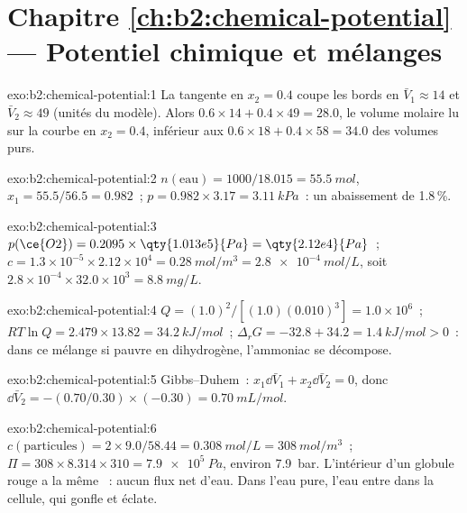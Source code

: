 \section*{Chapitre \ref{ch:b2:chemical-potential} --- Potentiel chimique et mélanges}

\begin{solution}{exo:b2:chemical-potential:1}
La tangente en $x_2 = 0.4$ coupe les bords en $\bar V_1 \approx 14$ et $\bar
V_2 \approx 49$ (unités du modèle). Alors $0.6 \times 14 + 0.4 \times 49 = 28.0$,
le volume molaire lu sur la courbe en $x_2 = 0.4$, inférieur aux
$0.6 \times 18 + 0.4 \times 58 = 34.0$ des volumes purs.
\end{solution}

\begin{solution}{exo:b2:chemical-potential:2}
$n(\text{eau}) = 1000/18.015 = \qty{55.5}{mol}$, $x_1 = 55.5/56.5 = 0.982$~;
$p = 0.982 \times 3.17 = \qty{3.11}{kPa}$~: un abaissement de 1.8\,\%.
\end{solution}

\begin{solution}{exo:b2:chemical-potential:3}
$p(\ce{O2}) = 0.2095 \times \qty{1.013e5}{Pa} = \qty{2.12e4}{Pa}$~;
$c = 1.3 \times 10^{-5} \times 2.12 \times 10^4 = \qty{0.28}{mol/m^3} =
\qty{2.8e-4}{mol/L}$, soit $2.8 \times 10^{-4} \times 32.0 \times 10^3 =
\qty{8.8}{mg/L}$.
\end{solution}

\begin{solution}{exo:b2:chemical-potential:4}
$Q = (1.0)^2/[(1.0)(0.010)^3] = 1.0 \times 10^6$~; $RT\ln Q = 2.479 \times 13.82 =
\qty{34.2}{kJ/mol}$~; $\Delta_r G = -32.8 + 34.2 = \qty{+1.4}{kJ/mol} > 0$~: dans ce
mélange si pauvre en dihydrogène, l'ammoniac se décompose.
\end{solution}

\begin{solution}{exo:b2:chemical-potential:5}
Gibbs--Duhem~: $x_1\dd\bar V_1 + x_2\dd\bar V_2 = 0$, donc $\dd\bar V_2 =
-(0.70/0.30) \times (-0.30) = \qty{+0.70}{mL/mol}$.
\end{solution}

\begin{solution}{exo:b2:chemical-potential:6}
$c(\text{particules}) = 2 \times 9.0/58.44 = \qty{0.308}{mol/L} =
\qty{308}{mol/m^3}$~; $\Pi = 308 \times 8.314 \times 310 = \qty{7.9e5}{Pa}$,
environ \qty{7.9}{bar}. L'intérieur d'un globule rouge a la même ~:
aucun flux net d'eau. Dans l'eau pure, l'eau entre dans la cellule, qui gonfle et
éclate.
\end{solution}

